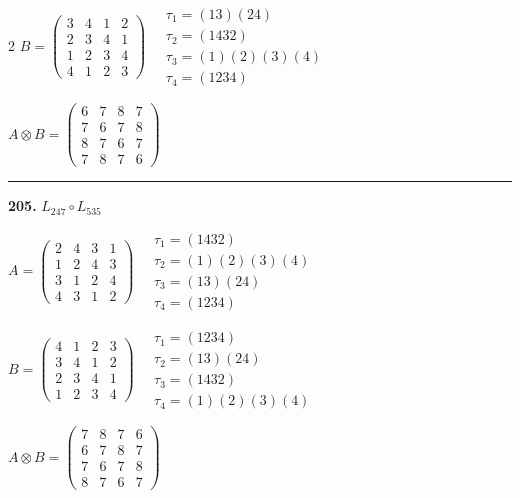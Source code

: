 \begin{multicols}{2}
$B = \begin{pmatrix} 3 & 4 & 1 & 2 \\ 2 & 3 & 4 & 1 \\ 1 & 2 & 3 & 4 \\ 4 & 1 & 2 & 3 \end{pmatrix} \quad \begin{matrix} \tau_{1}=(1 3)(2 4) \\ \tau_{2}=(1 4 3 2) \\ \tau_{3}=(1)(2)(3)(4) \\ \tau_{4}=(1 2 3 4) \end{matrix}$

$A \otimes B = \begin{pmatrix} 6 & 7 & 8 & 7 \\ 7 & 6 & 7 & 8 \\ 8 & 7 & 6 & 7 \\ 7 & 8 & 7 & 6 \end{pmatrix}$

\vspace{0.3em}
\hrule
\vspace{0.3em}

\noindent\textbf{205.} $L_{247} \circ L_{535}$

$A = \begin{pmatrix} 2 & 4 & 3 & 1 \\ 1 & 2 & 4 & 3 \\ 3 & 1 & 2 & 4 \\ 4 & 3 & 1 & 2 \end{pmatrix} \quad \begin{matrix} \tau_{1}=(1 4 3 2) \\ \tau_{2}=(1)(2)(3)(4) \\ \tau_{3}=(1 3)(2 4) \\ \tau_{4}=(1 2 3 4) \end{matrix}$

$B = \begin{pmatrix} 4 & 1 & 2 & 3 \\ 3 & 4 & 1 & 2 \\ 2 & 3 & 4 & 1 \\ 1 & 2 & 3 & 4 \end{pmatrix} \quad \begin{matrix} \tau_{1}=(1 2 3 4) \\ \tau_{2}=(1 3)(2 4) \\ \tau_{3}=(1 4 3 2) \\ \tau_{4}=(1)(2)(3)(4) \end{matrix}$

$A \otimes B = \begin{pmatrix} 7 & 8 & 7 & 6 \\ 6 & 7 & 8 & 7 \\ 7 & 6 & 7 & 8 \\ 8 & 7 & 6 & 7 \end{pmatrix}$


\end{multicols}
